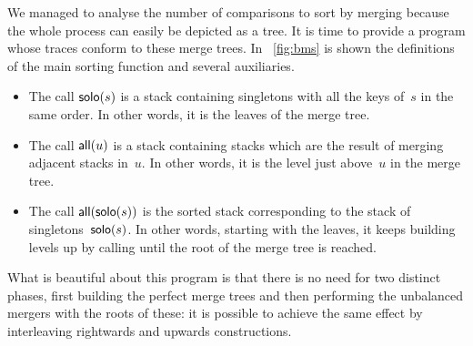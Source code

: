 We managed to analyse the number of comparisons to sort by merging
because the whole process can easily be depicted as a
tree. It is time to provide a program whose
traces conform to these merge trees. In \fig~\vref{fig:bms} is shown
the definitions of the main sorting function
 and several auxiliaries.
\begin{itemize}

  \item The call \(\textsf{solo}(s)\) is a stack
    containing singletons with all the keys of~\(s\) in the same
    order. In other words, it is the leaves of the merge tree.

  \item The call \(\textsf{all}(u)\) is a stack
    containing stacks which are the result of merging adjacent stacks
    in~\(u\). In other words, it is the level just above~\(u\) in the
    merge tree.

  \item The call \(\textsf{all}(\textsf{solo}(s))\) is the sorted stack
    corresponding to the stack of singletons~\(\textsf{solo}(s)\). In
    other words, starting with the leaves, it keeps building levels up
    by calling  until the root of
    the merge tree is reached.

\end{itemize}
What is beautiful about this program is that there is no need for two
distinct phases, first building the perfect merge trees and then
performing the unbalanced mergers with the roots of these: it is
possible to achieve the same effect by interleaving rightwards and
upwards constructions.
